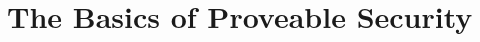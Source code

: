 \documentclass{article}
\begin{document}
	\section{The Basics of Proveable Security}
		\begin{adjustwidth*}{2em}{}
		\end{adjustwidth*}
	
\end{document}
